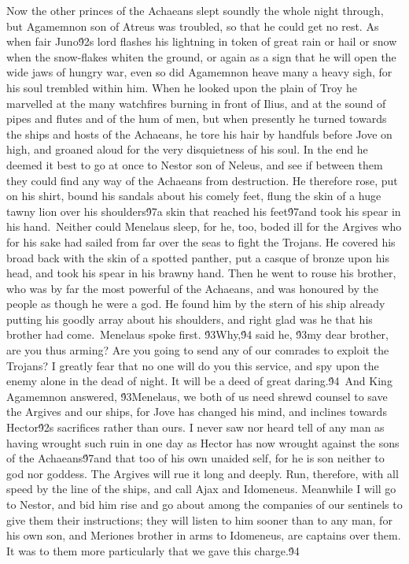 {  Now the other princes of the Achaeans slept soundly the whole night through, but Agamemnon son of Atreus was troubled, so that he could get no rest. As when fair Juno\'92s lord flashes his lightning in token of great rain or hail or snow when the snow-flakes whiten the ground, or again as a sign that he will open the wide jaws of hungry war, even so did Agamemnon heave many a heavy sigh, for his soul trembled within him. When he looked upon the plain of Troy he marvelled at the many watchfires burning in front of Ilius, and at the sound of pipes and flutes and of the hum of men, but when presently he turned towards the ships and hosts of the Achaeans, he tore his hair by handfuls before Jove on high, and groaned aloud for the very disquietness of his soul. In the end he deemed it best to go at once to Nestor son of Neleus, and see if between them they could find any way of the Achaeans from destruction. He therefore rose, put on his shirt, bound his sandals about his comely feet, flung the skin of a huge tawny lion over his shoulders\'97a skin that reached his feet\'97and took his spear in his hand.\
Neither could Menelaus sleep, for he, too, boded ill for the Argives who for his sake had sailed from far over the seas to fight the Trojans. He covered his broad back with the skin of a spotted panther, put a casque of bronze upon his head, and took his spear in his brawny hand. Then he went to rouse his brother, who was by far the most powerful of the Achaeans, and was honoured by the people as though he were a god. He found him by the stern of his ship already putting his goodly array about his shoulders, and right glad was he that his brother had come.\
Menelaus spoke first. \'93Why,\'94 said he, \'93my dear brother, are you thus arming? Are you going to send any of our comrades to exploit the Trojans? I greatly fear that no one will do you this service, and spy upon the enemy alone in the dead of night. It will be a deed of great daring.\'94\
And King Agamemnon answered, \'93Menelaus, we both of us need shrewd counsel to save the Argives and our ships, for Jove has changed his mind, and inclines towards Hector\'92s sacrifices rather than ours. I never saw nor heard tell of any man as having wrought such ruin in one day as Hector has now wrought against the sons of the Achaeans\'97and that too of his own unaided self, for he is son neither to god nor goddess. The Argives will rue it long and deeply. Run, therefore, with all speed by the line of the ships, and call Ajax and Idomeneus. Meanwhile I will go to Nestor, and bid him rise and go about among the companies of our sentinels to give them their instructions; they will listen to him sooner than to any man, for his own son, and Meriones brother in arms to Idomeneus, are captains over them. It was to them more particularly that we gave this charge.\'94\
}
